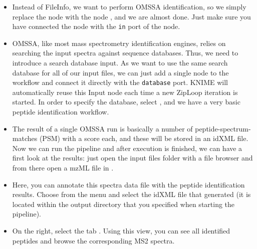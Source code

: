 \begin{itemize}
\item Instead of FileInfo, we want to perform OMSSA identification, so we simply replace the  node with the  node , and we are almost done. Just make sure you have connected the  node with the \texttt{in} port of the  node.
\item OMSSA, like most mass spectrometry identification engines, relies on searching the input spectra against sequence databases. Thus, we need to introduce a search database input. As we want to use the same search database for all of our input files, we can just add a single  node to the workflow and connect it directly with the  \texttt{database} port. KNIME will automatically reuse this Input node each time a new ZipLoop iteration is started. In order to specify the database, select , and we have a very basic peptide identification workflow.
\item The result of a single OMSSA run is basically a number of peptide-spectrum-matches (PSM) with a score each, and these will be stored in an idXML file. Now we can run the pipeline and after execution is finished, we can have a first look at the results: just open the input files folder with a file browser and from there open a mzML file in .
\item Here, you can annotate this spectra data file with the peptide identification results. Choose  from the menu and select the idXML file that  generated (it is located within the output directory that you specified when starting the pipeline).
\item On the right, select the tab . Using this view, you can see all identified peptides and browse the corresponding MS2 spectra.
\end{itemize}

